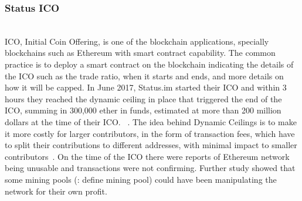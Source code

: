 \subsubsection{Status ICO} \hfill\\ %
\noindent ICO, Initial Coin Offering, is one of the blockchain applications, specially blockchains such as Ethereum with smart contract capability. The common practice is to deploy a smart contract on the blockchain indicating the details of the ICO such as the trade ratio, when it starts and ends, and more details on how it will be capped.
In June 2017, Status.im started their ICO and within 3 hours they reached the dynamic ceiling in place that triggered the end of the ICO, summing in 300,000 ether in funds, estimated at more than 200 million dollars at the time of their ICO. ~\cite{statusicoanalysis}. The idea behind Dynamic Ceilings is to make it more costly for larger contributors,  in the form of transaction fees, which have to split their contributions to different addresses, with minimal impact to smaller contributors~\cite{statuswhitepaper}.
On the time of the ICO there were reports of Ethereum network being unusable and transactions were not confirming. Further study showed that some mining pools (\todo: define mining pool) could have been manipulating the network for their own profit.





